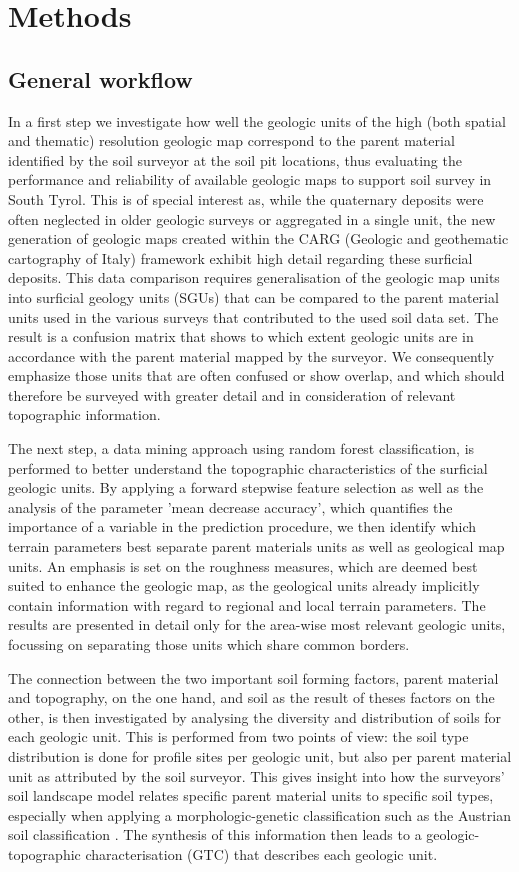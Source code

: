 \documentclass[preprint,12pt,authoryear]{elsarticle}
\begin{document}
\section{Methods}
\subsection{General workflow}
In a first step we investigate how well the geologic units of the high (both spatial and thematic) resolution geologic map correspond to the parent material identified by the soil surveyor at the soil pit locations, thus evaluating the performance and reliability of available geologic maps to support soil survey in South Tyrol. This is of special interest as, while the quaternary deposits were often neglected in older geologic surveys or aggregated in a single unit, the new generation of geologic maps created within the CARG (Geologic and geothematic cartography of Italy) framework  exhibit high detail regarding these surficial deposits. This data comparison requires generalisation of the geologic map units into surficial geology units (SGUs) that can be compared to the parent material units used in the various surveys that contributed to the used soil data set.  The result is a confusion matrix that shows to which extent geologic units are in accordance with the parent material mapped by the surveyor. We consequently emphasize those units that are often confused or show overlap, and which should therefore be surveyed with greater detail and in consideration of relevant topographic information.

The next step, a data mining approach using random forest classification, is performed to better understand the topographic characteristics of the surficial geologic units. By applying a forward stepwise feature selection as well as the analysis of the parameter 'mean decrease accuracy', which quantifies the importance of a variable in the prediction procedure, we then identify which terrain parameters best separate parent materials units as well as geological map units.  An emphasis is set on the roughness measures, which are deemed best suited to enhance the geologic map, as the geological units already implicitly contain information with regard to regional and local terrain parameters. The results are presented in detail only for the area-wise most relevant geologic units, focussing on separating those units which share common borders.

The connection between the two important soil forming factors, parent material and topography, on the one hand, and soil as the result of theses factors on the other, is then investigated by analysing the diversity and distribution of soils for each geologic unit. This is performed from two points of view: the soil type distribution is done for profile sites per geologic unit, but also per parent material unit as attributed by the soil surveyor. This gives insight into how the surveyors' soil landscape model relates specific parent material units to specific soil types, especially when applying a morphologic-genetic classification such as the Austrian soil classification \citep{Nestroy2000,Nestroy2011}. The synthesis of this information then leads to a geologic-topographic characterisation (GTC) that describes each geologic unit. 
\end{document}
